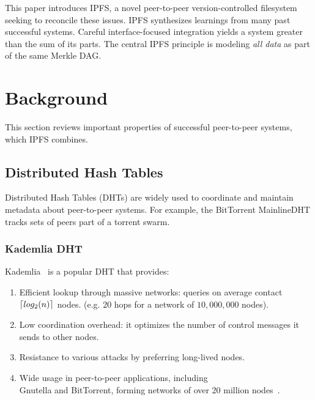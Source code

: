 \documentclass{sig-alternate}
\DeclarePairedDelimiter{\ceil}{\lceil}{\rceil}
\begin{document}
This paper introduces IPFS, a novel peer-to-peer version-controlled filesystem seeking to reconcile these issues. IPFS synthesizes learnings from many past successful systems. Careful interface-focused integration yields a system greater than the sum of its parts. The central IPFS principle is modeling \textit{all data} as part of the same Merkle DAG.

\section{Background}

This section reviews important properties of successful peer-to-peer systems, which IPFS combines.

\subsection{Distributed Hash Tables}

Distributed Hash Tables (DHTs) are widely used to coordinate and maintain metadata about peer-to-peer systems. For example, the BitTorrent MainlineDHT tracks sets of peers part of a torrent swarm.

\subsubsection{Kademlia DHT}

Kademlia~\cite{maymounkov02} is a popular DHT that provides:

\begin{enumerate}

  \item Efficient lookup through massive networks:
        queries on average contact $ \ceil{log_2 (n)} $ nodes.
        (e.g. $20$ hops for a network of $10,000,000$ nodes).

  \item Low coordination overhead: it optimizes the number of
        control messages it sends to other nodes.

  \item Resistance to various attacks by preferring long-lived nodes.

  \item Wide usage in peer-to-peer applications, including \\
        Gnutella and BitTorrent, forming networks of over 20 million nodes~\cite{wang13}.

 \end{enumerate}
\end{document}
